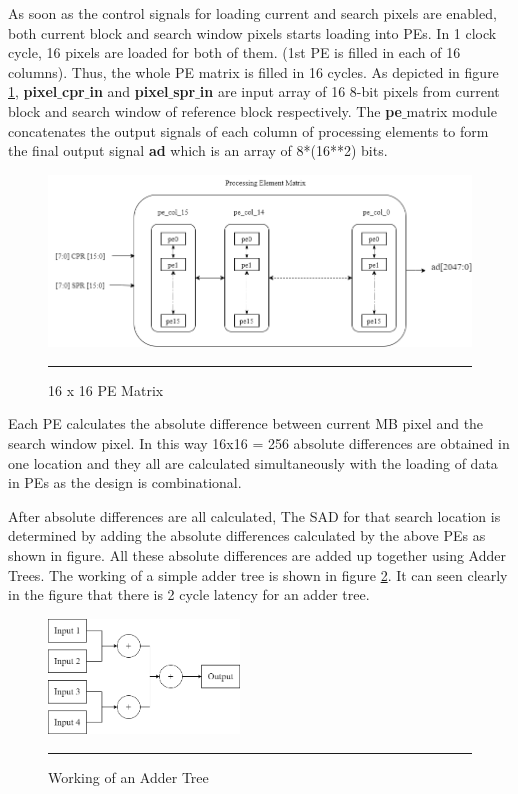 As soon as the control signals for loading current and search pixels are enabled, both current block and search window pixels starts loading into PEs. In 1 clock cycle, 16 pixels are loaded for both of them. (1st PE is filled in each of 16 columns). Thus, the whole PE matrix is filled in 16 cycles. As depicted in figure \ref{fig:pematrix}, \textbf{pixel$\_$cpr$\_$in} and \textbf{pixel$\_$spr$\_$in} are input array of 16 8-bit pixels from current block and search window of reference block respectively. The \textbf{pe$\_$}matrix module concatenates the output signals of each column of processing elements to form the final output signal \textbf{ad} which is an array of 8*(16**2) bits. 

\begin{figure}[H]
	\centering
	\includegraphics[width = 4.5in]{./Figures/pematrix.png}
	\rule{35em}{0.5pt}
	\caption{16 x 16 PE Matrix}
	\label{fig:pematrix}
\end{figure}

Each PE calculates the absolute difference between current MB pixel and the search window pixel. In this way 16x16 = 256 absolute differences are obtained in one location and they all are calculated simultaneously with the loading of data in PEs as the design is combinational. 

After absolute differences are all calculated, The SAD for that search location is determined by adding the absolute differences calculated by the above PEs as shown in figure. All these absolute differences are added up together using Adder Trees. The working of a simple adder tree is shown in figure \ref{fig:addertree}. It can seen clearly in the figure that there is 2 cycle latency for an adder tree. 

\begin{figure}[H]
	\centering
	\includegraphics[width = 2in]{./Figures/addertree.png}
	\rule{35em}{0.5pt}
	\caption{Working of an Adder Tree}
	\label{fig:addertree}
\end{figure}

